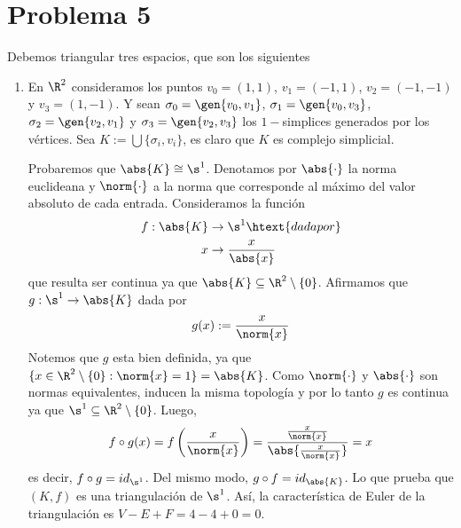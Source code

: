 \documentclass{article}
\begin{document}
\section*{Problema 5}
\noindent Debemos triangular tres espacios, que son los siguientes
\begin{enumerate}
    \item En $\R^{2}$ consideramos los puntos $v_{0}=(1,1)$, $v_{1}=(-1,1)$, $v_{2}=(-1,-1)$ y 
    $v_{3}=(1,-1)$. Y sean $\sigma_{0}=\gen{v_{0},v_{1}}$, $\sigma_{1}=\gen{v_{0},v_{3}}$, 
    $\sigma_{2}=\gen{v_{2},v_{1}}$ y $\sigma_{3}=\gen{v_{2},v_{3}}$ los $1-$simplices generados
    por los vértices. Sea $K:=\bigcup\{\sigma_{i},v_{i}\}$, es claro que $K$ es complejo 
    simplicial.
    \begin{center} %
    \end{center}
    Probaremos que $\abs{K}\cong\s^{1}$. Denotamos por $\abs{\cdot}$ la norma euclideana y 
    $\norm{\cdot}$ a la norma que corresponde al máximo del valor absoluto de cada entrada. 
    Consideramos la función
    \begin{align*}
        f:\abs{K} &\to \s^{1}\htext{dada por} \\
        x &\to \frac{x}{\abs{x}}
    \end{align*}
    que resulta ser continua ya que $\abs{K}\subseteq\R^{2}\setminus\{0\}$. Afirmamos que 
    $g:\s^{1}\to\abs{K}$ dada por
    \begin{equation*}
        g(x):=\frac{x}{\norm{x}}
    \end{equation*}
    Notemos que $g$ esta bien definida, ya que $\{x\in\R^{2}\setminus\{0\}:\norm{x}=1\}=\abs{K}$. 
    Como $\norm{\cdot}$ y $\abs{\cdot}$ son normas equivalentes, inducen la misma topología y por
    lo tanto $g$ es continua ya que $\s^{1}\subseteq\R^{2}\setminus\{0\}$. Luego,
    \begin{equation*}
        f\circ g(x)=f\left(\frac{x}{\norm{x}}\right)
        =\frac{\frac{x}{\norm{x}}}{\abs{\frac{x}{\norm{x}}}}=x
    \end{equation*}
    es decir, $f\circ g=id_{\s^{1}}$. Del mismo modo, $g\circ f=id_{\abs{K}}$. Lo que prueba que
    $(K,f)$ es una triangulación de $\s^{1}$. Así, la característica de Euler de la triangulación
    es $V-E+F=4-4+0=0$.


\end{enumerate}
\end{document}
